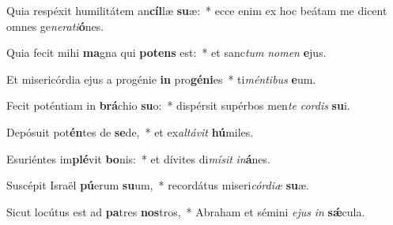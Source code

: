 \item Quia respéxit humilitátem an\textbf{cíl}læ \textbf{su}æ:~* ecce enim ex hoc beátam me dicent omnes ge\textit{ne}\textit{ra}\textit{ti}\textbf{ó}nes.
\item Quia fecit mihi \textbf{ma}gna qui \textbf{pot}\textbf{ens} est:~* et sanc\textit{tum} \textit{no}\textit{men} \textbf{e}jus.
\item Et misericórdia ejus a progénie \textbf{in} pro\textbf{gé}\textbf{ni}es~* ti\textit{mén}\textit{ti}\textit{bus} \textbf{e}um.
\item Fecit poténtiam in \textbf{brá}chio \textbf{su}o:~* dispérsit supérbos men\textit{te} \textit{cor}\textit{dis} \textbf{su}i.
\item Depósuit pot\textbf{én}tes de \textbf{se}de,~* et ex\textit{al}\textit{tá}\textit{vit} \textbf{hú}miles.
\item Esuriéntes im\textbf{plé}vit \textbf{bo}nis:~* et dívites di\textit{mí}\textit{sit} \textit{in}\textbf{á}nes.
\item Suscépit Israël \textbf{pú}erum \textbf{su}um,~* recordátus miseri\textit{cór}\textit{di}\textit{æ} \textbf{su}æ.
\item Sicut locútus est ad \textbf{pa}tres \textbf{nos}tros,~* Abraham et sémini \textit{e}\textit{jus} \textit{in} \textbf{sǽ}cula.
